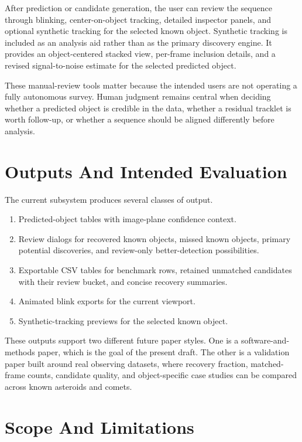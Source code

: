 \documentclass[modern]{aastex701}
\begin{document}
After prediction or candidate generation, the user can review the sequence through blinking, center-on-object tracking, detailed inspector panels, and optional synthetic tracking for the selected known object. Synthetic tracking is included as an analysis aid rather than as the primary discovery engine. It provides an object-centered stacked view, per-frame inclusion details, and a revised signal-to-noise estimate for the selected predicted object.

These manual-review tools matter because the intended users are not operating a fully autonomous survey. Human judgment remains central when deciding whether a predicted object is credible in the data, whether a residual tracklet is worth follow-up, or whether a sequence should be aligned differently before analysis.

\section{Outputs And Intended Evaluation}\label{sec:outputs}

The current subsystem produces several classes of output.

\begin{enumerate}
\item Predicted-object tables with image-plane confidence context.
\item Review dialogs for recovered known objects, missed known objects, primary potential discoveries, and review-only better-detection possibilities.
\item Exportable CSV tables for benchmark rows, retained unmatched candidates with their review bucket, and concise recovery summaries.
\item Animated blink exports for the current viewport.
\item Synthetic-tracking previews for the selected known object.
\end{enumerate}

These outputs support two different future paper styles. One is a software-and-methods paper, which is the goal of the present draft. The other is a validation paper built around real observing datasets, where recovery fraction, matched-frame counts, candidate quality, and object-specific case studies can be compared across known asteroids and comets.

\section{Scope And Limitations}\label{sec:limitations}
\end{document}
